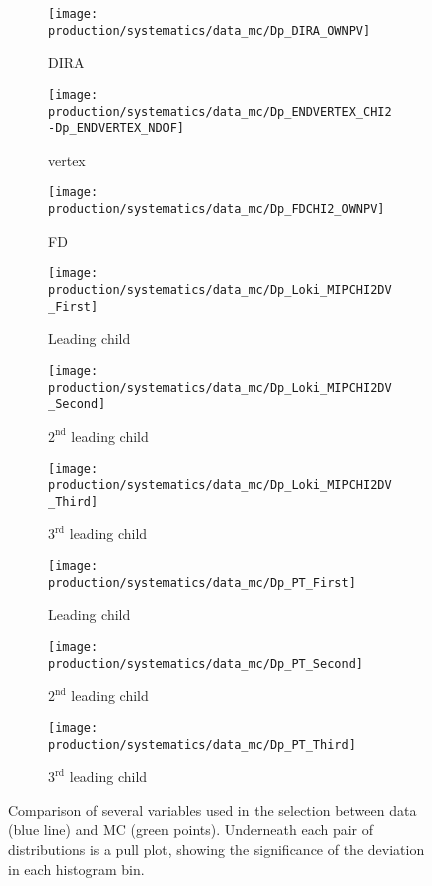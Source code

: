 \begin{figure}
  \begin{subfigure}{0.3\textwidth}
    \centering
    \texttt{[image: production/systematics/data\_mc/Dp\_DIRA\_OWNPV]}
    \caption{\PDplus \ac{DIRA}}
  \end{subfigure}
  \begin{subfigure}{0.3\textwidth}
    \centering
    \texttt{[image: production/systematics/data\_mc/Dp\_ENDVERTEX\_CHI2-Dp\_ENDVERTEX\_NDOF]}
    \caption{\PDplus vertex \chisq}
  \end{subfigure}
  \begin{subfigure}{0.3\textwidth}
    \centering
    \texttt{[image: production/systematics/data\_mc/Dp\_FDCHI2\_OWNPV]}
    \caption{\PDzero FD \chisq}
  \end{subfigure}

  \begin{subfigure}{0.3\textwidth}
    \centering
    \texttt{[image: production/systematics/data\_mc/Dp\_Loki\_MIPCHI2DV\_First]}
    \caption{Leading child \ipchisq}
  \end{subfigure}
  \begin{subfigure}{0.3\textwidth}
    \centering
    \texttt{[image: production/systematics/data\_mc/Dp\_Loki\_MIPCHI2DV\_Second]}
    \caption{$2^{\text{nd}}$ leading child \ipchisq}
  \end{subfigure}
  \begin{subfigure}{0.3\textwidth}
    \centering
    \texttt{[image: production/systematics/data\_mc/Dp\_Loki\_MIPCHI2DV\_Third]}
    \caption{$3^{\text{rd}}$ leading child \ipchisq}
  \end{subfigure}

  \begin{subfigure}{0.3\textwidth}
    \centering
    \texttt{[image: production/systematics/data\_mc/Dp\_PT\_First]}
    \caption{Leading child \pT}
  \end{subfigure}
  \begin{subfigure}{0.3\textwidth}
    \centering
    \texttt{[image: production/systematics/data\_mc/Dp\_PT\_Second]}
    \caption{$2^{\text{nd}}$ leading child \pT}
  \end{subfigure}
  \begin{subfigure}{0.3\textwidth}
    \centering
    \texttt{[image: production/systematics/data\_mc/Dp\_PT\_Third]}
    \caption{$3^{\text{rd}}$ leading child \pT}
  \end{subfigure}

  \caption{%
    Comparison of several variables used in the \DpToKpipi selection between
    data (blue line) and \ac{MC} (green points).
    Underneath each pair of distributions is a pull plot, showing the
    significance of the deviation in each histogram bin.
  }
  \label{fig:prod:syst:mc:DpToKpipi}
\end{figure}

